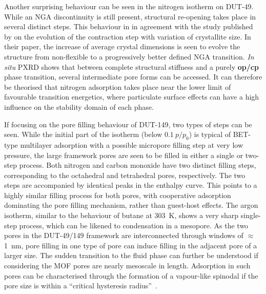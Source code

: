 Another surprising behaviour
can be seen in the nitrogen isotherm on DUT-49. While an NGA
discontinuity is still present, structural re-opening takes
place in several distinct steps. This behaviour in in
agreement with the study published by
 \citet{krauseEffectCrystalliteSize2018}
on the evolution of the contraction step with variation of 
crystallite size. In their paper, the increase of average 
crystal dimensions is seen to evolve the structure from non-flexible 
to a progressively better defined NGA transition. \textit{In situ} 
PXRD shows that between complete structural stiffness and a 
purely \textbf{op/cp} phase transition, several intermediate 
pore forms can be accessed. It can therefore be theorised that 
nitrogen adsorption takes place near the lower limit of 
favourable transition energetics, where particulate surface 
effects can have a high influence on the stability domain of
each phase.

If focusing on the pore filling behaviour of DUT-149, two types
of steps can be seen. While the initial part of the isotherm 
(below \(0.1~p/p_0\)) is typical of BET-type multilayer adsorption
with a possible micropore filling step at very low pressure,
the large framework pores are seen to be filled in either a single or
two-step process.
Both nitrogen and carbon monoxide have two distinct filling
steps, corresponding to the octahedral and tetrahedral pores,
respectively. The two steps are accompanied by identical 
peaks in the enthalpy curve. This points to a highly similar 
filling process for both pores, with cooperative adsorption
dominating the pore filling mechanism, rather than guest-host 
effects. The argon isotherm, similar to the behaviour of 
butane at \SI{303}{\kelvin}, shows a very sharp single-step process,
which can be likened to condensation in a mesopore. As the 
two pores in the DUT-49/149 framework are interconnected through 
windows of \(\approx\)\SI{1}{\nano\metre}, pore filling 
in one type of pore can induce filling in the adjacent pore of 
a larger size. The sudden transition to the fluid phase can further
be understood if considering the MOF pores are nearly mesoscale in 
length. Adsorption in such pores can be characterised through 
the formation of a vapour-like spinodal if the pore size is within
a ``critical hysteresis radius''~\cite{hiratsukaCriticalEnergyBarrier2016}.

